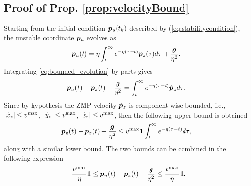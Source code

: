 \subsection{Proof of Prop. \ref{prop:velocityBound}}
\label{sec:Proof}

Starting from the initial condition ${\bm{p}}_u(t_k)$ described by (\ref{eq:stabilitycondition}), the unstable coordinate ${\bm{p}}_u$ evolves as
\begin{equation}
\label{eq:bounded_evolution}
{\bm{p}}_u(t) = \eta\int_{t}^\infty e^{-\eta(\tau-t)}{\bm{p}}_z(\tau) d\tau + \frac{{\bm{g}}}{\eta^2}.
\end{equation}
Integrating \ref{eq:bounded_evolution} by parts gives
\begin{equation}
\label{eq:bounded_evolution_integrated}
{\bm{p}}_u(t) - {\bm{p}}_z(t) - \frac{{\bm{g}}}{\eta^2} = \int_{t}^\infty e^{-\eta(\tau-t)}\dot{{\bm{p}}}_z d\tau.
\end{equation}
Since by hypothesis the ZMP velocity $\dot{{\bm{p}}}_z$ is component-wise bounded, i.e., $|\dot x_z| \le v^{\rm max}$, $|\dot y_z| \le v^{\rm max}$, $|\dot z_z| \le v^{\rm max}$, then the following upper bound is obtained
\begin{equation*}
{\bm{p}}_u(t) - {\bm{p}}_z(t) - \frac{{\bm{g}}}{\eta^2} \leq v^{\rm max}{\bf 1}\int_{t}^\infty e^{-\eta(\tau-t)}  d\tau,
\end{equation*}
along with a similar lower bound.
The two bounds can be combined in the following expression
\begin{equation}
\label{eq:bound unstable}
-\frac{v^{\rm max}}{\eta}{\bf 1}
\le
{\bm{p}}_u(t) - {\bm{p}}_z(t) - \frac{{\bm{g}}}{\eta^2}
\le
\frac{v^{\rm max}}{\eta}{\bf 1}.
\end{equation}

